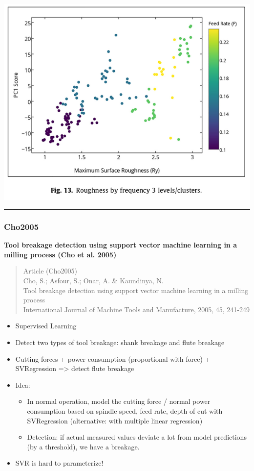 \documentclass[
  letterpaper,
  DIV=11,
  numbers=noendperiod]{scrartcl}
\providecommand{\tightlist}{%
  \setlength{\itemsep}{0pt}\setlength{\parskip}{0pt}}\usepackage{longtable,booktabs,array}
\begin{document}
\includegraphics{img/2023-01-07-12-16-33.png}

\begin{center}\rule{0.5\linewidth}{0.5pt}\end{center}

\hypertarget{cho2005}{%
\subsubsection{Cho2005}\label{cho2005}}

\textbf{Tool breakage detection using support vector machine learning in
a milling process (Cho et al. 2005)}

\begin{quote}
Article (Cho2005)\\
Cho, S.; Asfour, S.; Onar, A. \& Kaundinya, N.\\
Tool breakage detection using support vector machine learning in a
milling process\\
International Journal of Machine Tools and Manufacture, 2005, 45,
241-249
\end{quote}

\begin{itemize}
\tightlist
\item
  Supervised Learning
\item
  Detect two types of tool breakage: shank breakage and flute breakage
\item
  Cutting forces + power consumption (proportional with force) +
  SVRegression =\textgreater{} detect flute breakage
\item
  Idea:

  \begin{itemize}
  \tightlist
  \item
    In normal operation, model the cutting force / normal power
    consumption based on spindle speed, feed rate, depth of cut with
    SVRegression (alternative: with multiple linear regression)
  \item
    Detection: if actual measured values deviate a lot from model
    predictions (by a threshold), we have a breakage.
  \end{itemize}
\item
  SVR is hard to parameterize!
\end{itemize}
\end{document}

